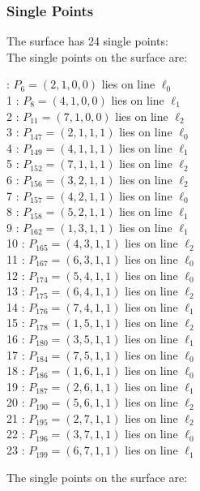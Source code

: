 \documentclass{article}
\begin{document}
{\subsubsection*{Single Points}
The surface has 24 single points:\\
The single points on the surface are:\\
\begin{multicols}{2}
 : $P_{6}=( 2, 1, 0, 0 )$ lies on line $\ell_{0}$\\
1 : $P_{8}=( 4, 1, 0, 0 )$ lies on line $\ell_{1}$\\
2 : $P_{11}=( 7, 1, 0, 0 )$ lies on line $\ell_{2}$\\
3 : $P_{147}=( 2, 1, 1, 1 )$ lies on line $\ell_{0}$\\
4 : $P_{149}=( 4, 1, 1, 1 )$ lies on line $\ell_{1}$\\
5 : $P_{152}=( 7, 1, 1, 1 )$ lies on line $\ell_{2}$\\
6 : $P_{156}=( 3, 2, 1, 1 )$ lies on line $\ell_{2}$\\
7 : $P_{157}=( 4, 2, 1, 1 )$ lies on line $\ell_{0}$\\
8 : $P_{158}=( 5, 2, 1, 1 )$ lies on line $\ell_{1}$\\
9 : $P_{162}=( 1, 3, 1, 1 )$ lies on line $\ell_{1}$\\
10 : $P_{165}=( 4, 3, 1, 1 )$ lies on line $\ell_{2}$\\
11 : $P_{167}=( 6, 3, 1, 1 )$ lies on line $\ell_{0}$\\
12 : $P_{174}=( 5, 4, 1, 1 )$ lies on line $\ell_{0}$\\
13 : $P_{175}=( 6, 4, 1, 1 )$ lies on line $\ell_{2}$\\
14 : $P_{176}=( 7, 4, 1, 1 )$ lies on line $\ell_{1}$\\
15 : $P_{178}=( 1, 5, 1, 1 )$ lies on line $\ell_{2}$\\
16 : $P_{180}=( 3, 5, 1, 1 )$ lies on line $\ell_{1}$\\
17 : $P_{184}=( 7, 5, 1, 1 )$ lies on line $\ell_{0}$\\
18 : $P_{186}=( 1, 6, 1, 1 )$ lies on line $\ell_{0}$\\
19 : $P_{187}=( 2, 6, 1, 1 )$ lies on line $\ell_{1}$\\
20 : $P_{190}=( 5, 6, 1, 1 )$ lies on line $\ell_{2}$\\
21 : $P_{195}=( 2, 7, 1, 1 )$ lies on line $\ell_{2}$\\
22 : $P_{196}=( 3, 7, 1, 1 )$ lies on line $\ell_{0}$\\
23 : $P_{199}=( 6, 7, 1, 1 )$ lies on line $\ell_{1}$\\
\end{multicols}
The single points on the surface are:\\
}
\end{document}
